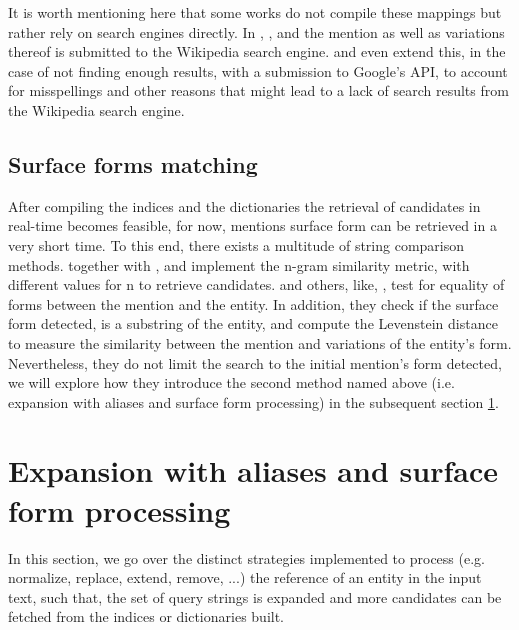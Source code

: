 It is worth mentioning here that some works do not compile these mappings but rather rely on search engines directly. In \cite{Han2009NLPR}, \cite{Durrett2014}, and \cite{Fang2020} the mention as well as variations thereof is submitted to the Wikipedia search engine.\newline \cite{Han2009NLPR} and \cite{Fang2020} even extend this, in the case of not finding enough results, with a submission to Google's API, to account for misspellings and other reasons that might lead to a lack of search results from the Wikipedia search engine.

\subsection{Surface forms matching}
\label{Surface forms matching}
After compiling the indices and the dictionaries the retrieval of candidates in real-time becomes feasible, for now, mentions surface form can be retrieved in a very short time. To this end, there exists a multitude of string comparison methods.\cite{AGDISTIS} together with \cite{Parravicini2019}, \cite{Moussallem2017} and \cite{Phan2017} implement the n-gram similarity metric, with different values for n to retrieve candidates.\newline
\cite{Phan2017} and others, like, \cite{Moreno2017}, test for equality of forms between the mention and the entity. In addition, they check if the surface form detected, is a substring of the entity, and compute the Levenstein distance to measure the similarity between the mention and variations of the entity's form. Nevertheless, they do not limit the search to the initial mention's form detected, we will explore how they introduce the second method named above (i.e. expansion with aliases and surface form processing) in the subsequent section \ref{surface form processing}.

\section{Expansion with aliases and surface form processing}
\label{surface form processing}
In this section, we go over the distinct strategies implemented to process (e.g. normalize, replace, extend, remove, ...) the reference of an entity in the input text, such that, the set of query strings is expanded and more candidates can be fetched from the indices or dictionaries built.\newline

